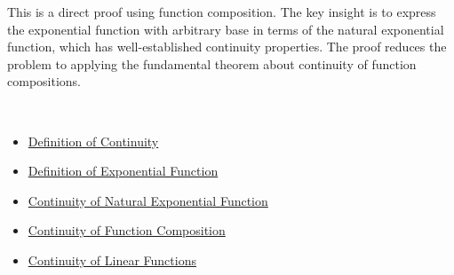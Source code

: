 \begin{remark*}
This is a direct proof using function composition. The key insight is to express the exponential function with arbitrary base in terms of the natural exponential function, which has well-established continuity properties. The proof reduces the problem to applying the fundamental theorem about continuity of function compositions.
\end{remark*}

\begin{remark*}[Dependencies]~\\
\begin{itemize}
  \item \hyperref[def:continuity]{Definition of Continuity}
  \item \hyperref[def:exponential-function]{Definition of Exponential Function}
  \item \hyperref[thm:exponential-continuous]{Continuity of Natural Exponential Function}
  \item \hyperref[thm:composition-continuous]{Continuity of Function Composition}
  \item \hyperref[thm:linear-continuous]{Continuity of Linear Functions}
\end{itemize}
\end{remark*}

